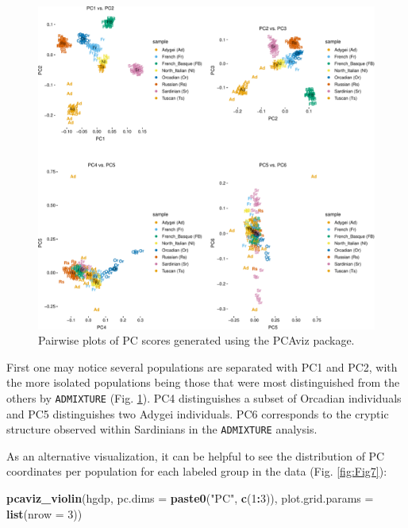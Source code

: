 \documentclass{svmult}       %
\newenvironment{Shaded}{\begin{snugshade}}{\end{snugshade}}
\newcommand{\KeywordTok}[1]{\textcolor[rgb]{0.13,0.29,0.53}{\textbf{#1}}}
\newcommand{\DataTypeTok}[1]{\textcolor[rgb]{0.13,0.29,0.53}{#1}}
\newcommand{\DecValTok}[1]{\textcolor[rgb]{0.00,0.00,0.81}{#1}}
\newcommand{\StringTok}[1]{\textcolor[rgb]{0.31,0.60,0.02}{#1}}
\newcommand{\OperatorTok}[1]{\textcolor[rgb]{0.81,0.36,0.00}{\textbf{#1}}}
\newcommand{\NormalTok}[1]{#1}
\begin{document}
\begin{figure}
\includegraphics[width=1\linewidth]{Figures/Figure6}
 \caption{\label{fig:Fig6}
     Pairwise plots of PC scores generated using the PCAviz package.}
\end{figure}

First one may notice several populations are separated with PC1 and PC2,
with the more isolated populations being those that were most
distinguished from the others by \texttt{ADMIXTURE} (Fig. \ref{fig:Fig6}). PC4 distinguishes a
subset of Orcadian individuals and PC5 distinguishes two Adygei
individuals. PC6 corresponds to the cryptic structure observed within
Sardinians in the \texttt{ADMIXTURE} analysis.

As an alternative visualization, it can be helpful to see the
distribution of PC coordinates per population for each labeled group in
the data (Fig. \ref{fig:Fig7}):

\begin{Shaded}
\begin{Highlighting}[]
\KeywordTok{pcaviz_violin}\NormalTok{(hgdp, }\DataTypeTok{pc.dims =} \KeywordTok{paste0}\NormalTok{(}\StringTok{"PC"}\NormalTok{, }\KeywordTok{c}\NormalTok{(}\DecValTok{1}\OperatorTok{:}\DecValTok{3}\NormalTok{)), }
              \DataTypeTok{plot.grid.params =} \KeywordTok{list}\NormalTok{(}\DataTypeTok{nrow =} \DecValTok{3}\NormalTok{))}
\end{Highlighting}
\end{Shaded}
\end{document}

